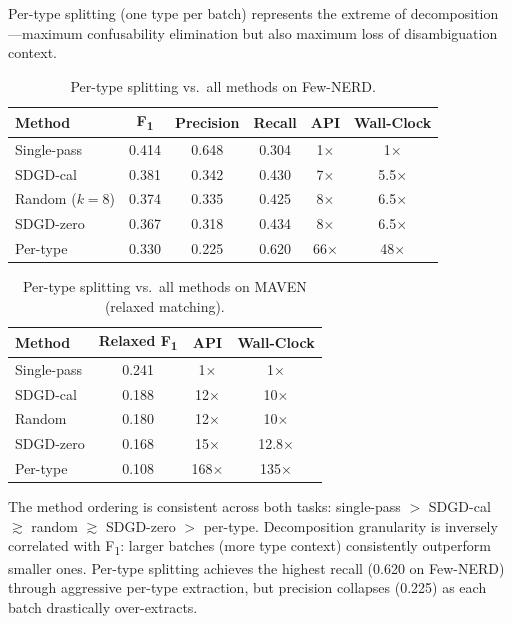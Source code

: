 \documentclass[11pt,a4paper]{article}
\newcommand{\fone}{F\textsubscript{1}}
\begin{document}
Per-type splitting (one type per batch) represents the extreme of decomposition---maximum confusability elimination but also maximum loss of disambiguation context.

\begin{table}[h]
\centering
\caption{Per-type splitting vs.\ all methods on Few-NERD.}
\label{tab:pertype_fewnerd}
\small
\begin{tabular}{lccccc}
\toprule
\textbf{Method} & \textbf{\fone{}} & \textbf{Precision} & \textbf{Recall} & \textbf{API} & \textbf{Wall-Clock} \\
\midrule
Single-pass & 0.414 & 0.648 & 0.304 & 1$\times$ & 1$\times$ \\
SDGD-cal    & 0.381 & 0.342 & 0.430 & 7$\times$ & 5.5$\times$ \\
Random ($k{=}8$) & 0.374 & 0.335 & 0.425 & 8$\times$ & 6.5$\times$ \\
SDGD-zero   & 0.367 & 0.318 & 0.434 & 8$\times$ & 6.5$\times$ \\
Per-type    & 0.330 & 0.225 & 0.620 & 66$\times$ & 48$\times$ \\
\bottomrule
\end{tabular}
\end{table}

\begin{table}[h]
\centering
\caption{Per-type splitting vs.\ all methods on MAVEN (relaxed matching).}
\label{tab:pertype_maven}
\small
\begin{tabular}{lccc}
\toprule
\textbf{Method} & \textbf{Relaxed \fone{}} & \textbf{API} & \textbf{Wall-Clock} \\
\midrule
Single-pass & 0.241 & 1$\times$ & 1$\times$ \\
SDGD-cal    & 0.188 & 12$\times$ & 10$\times$ \\
Random      & 0.180 & 12$\times$ & 10$\times$ \\
SDGD-zero   & 0.168 & 15$\times$ & 12.8$\times$ \\
Per-type    & 0.108 & 168$\times$ & 135$\times$ \\
\bottomrule
\end{tabular}
\end{table}

The method ordering is consistent across both tasks: single-pass $>$ SDGD-cal $\gtrsim$ random $\gtrsim$ SDGD-zero $>$ per-type.
Decomposition granularity is inversely correlated with \fone{}: larger batches (more type context) consistently outperform smaller ones.
Per-type splitting achieves the highest recall (0.620 on Few-NERD) through aggressive per-type extraction, but precision collapses (0.225) as each batch drastically over-extracts.
\end{document}
